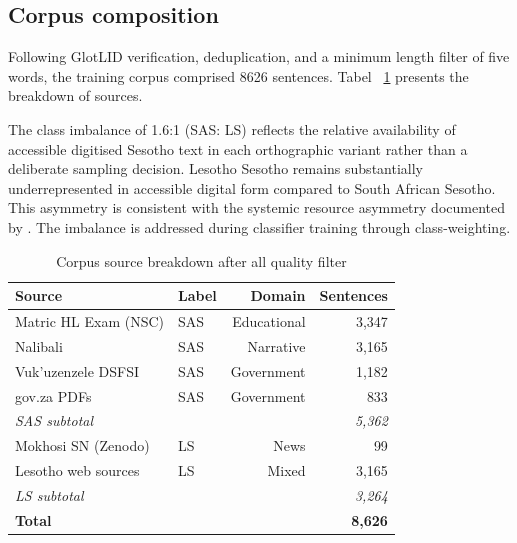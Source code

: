 \documentclass[12pt]{ThesisRU}
\begin{document}
\subsection{Corpus composition}

Following GlotLID verification, deduplication, and a minimum length filter of five words, the training corpus comprised 8626 sentences. Tabel ~\ref{tab:corpus_sources_meth} presents the breakdown of sources.

The class imbalance of 1.6:1 (SAS: LS) reflects the relative availability of accessible digitised Sesotho text in each orthographic variant rather than a deliberate sampling decision. Lesotho Sesotho remains substantially underrepresented in accessible digital form compared to South African Sesotho. This asymmetry is consistent with the systemic resource asymmetry documented by \citet{mokhosi2024sesotho}. The imbalance is addressed during classifier training through class-weighting.

\begin{table}[ht]
    \centering
    \begin{tabular}{llrr}
    \toprule
    \textbf{Source} & \textbf{Label} & \textbf{Domain} & \textbf{Sentences} \\
    \midrule
    Matric HL Exam (NSC) & SAS & Educational  & 3,347 \\
    Nalibali             & SAS & Narrative    & 3,165 \\
    Vuk'uzenzele DSFSI   & SAS & Government   & 1,182 \\
    gov.za PDFs          & SAS & Government   &   833 \\
    \midrule
    \textit{SAS subtotal} &    &              & \textit{5,362} \\
    \midrule
    Mokhosi SN (Zenodo)  & LS  & News         &    99 \\
    Lesotho web sources  & LS  & Mixed        & 3,165 \\
    \midrule
    \textit{LS subtotal} &     &              & \textit{3,264} \\
    \midrule
    \textbf{Total}       &     &              & \textbf{8,626} \\
    \bottomrule
    \end{tabular}
    \caption{Corpus source breakdown after all quality filter}
    \label{tab:corpus_sources_meth}
\end{table}
\end{document}
